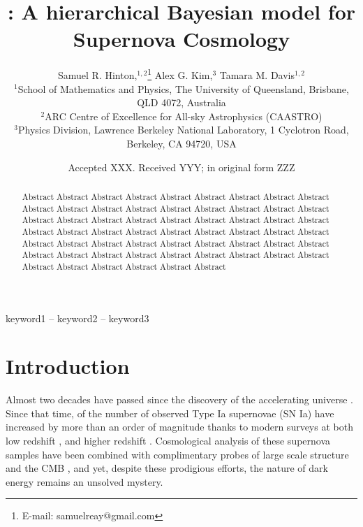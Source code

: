 \documentclass[a4paper,fleqn,usenatbib]{mnras}
\title[\name]{\name: A hierarchical Bayesian model for Supernova Cosmology}
\author[S. R. Hinton et al.]{
	Samuel R. Hinton,$^{1,2}$\thanks{E-mail: samuelreay@gmail.com}
	Alex G. Kim,$^{3}$
	Tamara M. Davis$^{1,2}$
	\\
	$^{1}$School of Mathematics and Physics, The University of Queensland, Brisbane, QLD 4072, Australia\\
	$^{2}$ARC Centre of Excellence for All-sky Astrophysics (CAASTRO)\\
	$^{3}$Physics Division, Lawrence Berkeley National Laboratory, 1 Cyclotron Road, Berkeley, CA 94720, USA
}
\date{Accepted XXX. Received YYY; in original form ZZZ}
\begin{document}
\label{firstpage}
\pagerange{\pageref{firstpage}--\pageref{lastpage}}
\maketitle











\begin{abstract}
Abstract Abstract Abstract Abstract Abstract Abstract Abstract Abstract Abstract Abstract
Abstract Abstract Abstract Abstract Abstract Abstract Abstract Abstract Abstract Abstract
Abstract Abstract Abstract Abstract Abstract Abstract Abstract Abstract Abstract Abstract
Abstract Abstract Abstract Abstract Abstract Abstract Abstract Abstract Abstract Abstract
Abstract Abstract Abstract Abstract Abstract Abstract Abstract Abstract Abstract Abstract
Abstract Abstract Abstract Abstract Abstract Abstract Abstract Abstract Abstract Abstract
\end{abstract}

\begin{keywords}
keyword1 -- keyword2 -- keyword3
\end{keywords}










\section{Introduction}

Almost two decades have passed since the discovery of the accelerating universe \citep{Riess1998, Perlmutter1999}. Since that time, of the number of observed Type Ia supernovae (SN Ia) have increased by more than an order of magnitude thanks to modern surveys at both low redshift \citep{Bailey2008, Freedman2009, Hicken2009,  Contreras2010, Conley2011}, and higher redshift \citep{Astier2006, Wood-Vasey2007, Balland2009, Amanullah2010}. Cosmological analysis of these supernova samples \citep{Kowalski2008, Conley2011, Suzuki2012, Betoule2014, Rest2014} have been combined with complimentary probes of large scale structure \citep{Alam2017} and the CMB \citep{Hinshaw2013, PlanckCollaboration2013}, and yet, despite these prodigious efforts, the nature of dark energy remains an unsolved mystery.
\end{document}
